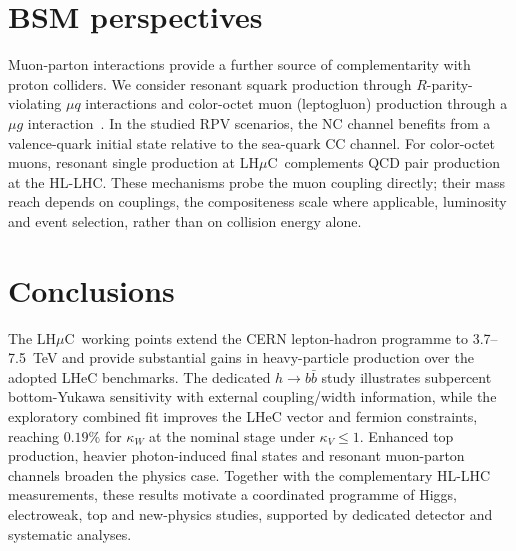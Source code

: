\documentclass[a4paper,11pt]{article}
\newcommand{\lhmuc}{LH$\mu$C}
\begin{document}
\section{BSM perspectives}\label{sec:BSM}


Muon-parton interactions provide a further source of complementarity with proton colliders. 
We consider resonant squark production through $R$-parity-violating $\mu q$ interactions 
and color-octet muon (leptogluon) production through a $\mu g$ interaction~\cite{HELP4CERN,Cheung:2021iev}. 
In the studied RPV scenarios, the NC channel benefits from a valence-quark initial state relative 
to the sea-quark CC channel. For color-octet muons, resonant single production 
at \lhmuc\ complements QCD pair production at the HL-LHC. 
These mechanisms probe the muon coupling directly; their mass reach depends on 
couplings, the compositeness scale where applicable, luminosity and event selection, 
rather than on collision energy alone. 



\section{Conclusions}\label{sec:outlook}

The \lhmuc\ working points extend the CERN lepton-hadron programme to 3.7--7.5~TeV and 
provide substantial gains in heavy-particle production over the adopted LHeC benchmarks. 
The dedicated $h\to b\bar b$ study illustrates subpercent bottom-Yukawa sensitivity with 
external coupling/width information, while the exploratory combined fit improves the   
LHeC vector and fermion constraints, reaching $0.19\%$ for $\kappa_W$ at the nominal 
stage under $\kappa_V\le1$. Enhanced top production, heavier photon-induced final states 
and resonant muon-parton channels broaden the physics case. 
Together with the complementary HL-LHC measurements, these results motivate a 
coordinated programme of Higgs, electroweak, top and new-physics studies, supported by 
dedicated detector and systematic analyses. 


\end{document}
